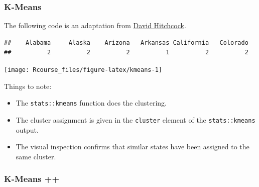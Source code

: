 \documentclass[]{book}
\newenvironment{Shaded}{\begin{snugshade}}{\end{snugshade}}
\newcommand{\KeywordTok}[1]{\textcolor[rgb]{0.13,0.29,0.53}{\textbf{#1}}}
\newcommand{\DataTypeTok}[1]{\textcolor[rgb]{0.13,0.29,0.53}{#1}}
\newcommand{\DecValTok}[1]{\textcolor[rgb]{0.00,0.00,0.81}{#1}}
\newcommand{\StringTok}[1]{\textcolor[rgb]{0.31,0.60,0.02}{#1}}
\newcommand{\CommentTok}[1]{\textcolor[rgb]{0.56,0.35,0.01}{\textit{#1}}}
\newcommand{\ControlFlowTok}[1]{\textcolor[rgb]{0.13,0.29,0.53}{\textbf{#1}}}
\newcommand{\OperatorTok}[1]{\textcolor[rgb]{0.81,0.36,0.00}{\textbf{#1}}}
\newcommand{\NormalTok}[1]{#1}
\providecommand{\tightlist}{%
  \setlength{\itemsep}{0pt}\setlength{\parskip}{0pt}}
\theoremstyle{definition}
\theoremstyle{definition}
\theoremstyle{definition}
\theoremstyle{remark}
\begin{document}
\subsubsection{K-Means}\label{k-means-2}

The following code is an adaptation from
\href{http://people.stat.sc.edu/Hitchcock/chapter6_R_examples.txt}{David
Hitchcock}.

\begin{Shaded}
\end{Shaded}

\begin{verbatim}
##    Alabama     Alaska    Arizona   Arkansas California   Colorado 
##          2          2          2          1          2          2
\end{verbatim}

\begin{Shaded}
\end{Shaded}

\texttt{[image: Rcourse\_files/figure-latex/kmeans-1]}

Things to note:

\begin{itemize}
\tightlist
\item
  The \texttt{stats::kmeans} function does the clustering.
\item
  The cluster assignment is given in the \texttt{cluster} element of the
  \texttt{stats::kmeans} output.
\item
  The visual inspection confirms that similar states have been assigned
  to the same cluster.
\end{itemize}

\subsubsection{K-Means ++}\label{k-means-3}
\end{document}
